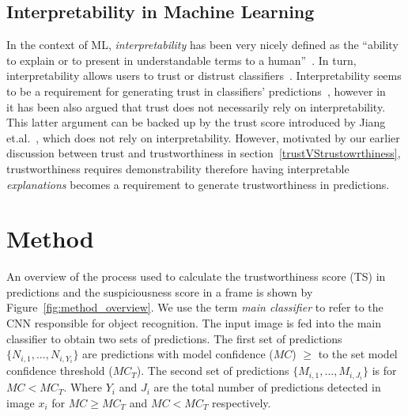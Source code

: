 \subsection{Interpretability in Machine Learning}
In the context of ML, \textit{interpretability} has been very nicely defined as the ``ability to explain or to present in understandable terms to a human''~\cite{Doshi-Velez2017}. 
%
In turn, interpretability allows users to trust or distrust classifiers~\cite{Rudin2022}. 
%
Interpretability seems to be a requirement for generating trust in classifiers' predictions~\cite{Ribeiro2016, Lipton2018}, however in ~\cite{Lipton2018} it has been also argued that trust does not necessarily rely on interpretability. This latter argument can be backed up by the trust score introduced by Jiang et.al.~\cite{Jiang2018}, which does not rely on interpretability. 
%
However, motivated by our earlier discussion between trust and trustworthiness in section~\ref{trustVStrustowrthiness}, trustworthiness requires demonstrability therefore having interpretable \textit{explanations} becomes a requirement to generate trustworthiness in predictions.
%
%



\section{Method} \label{sec:method}
An overview of the process used to calculate the trustworthiness score (TS) in predictions and the suspiciousness score in a frame is shown by 
Figure~\ref{fig:method_overview}. 
%
We use the term \textit{main classifier} to refer to the CNN responsible for object recognition. 
%
The input image is fed into the main classifier to obtain two sets of predictions. The first set of predictions $\{N_{i,1},..., N_{i,Y_i}\}$ are predictions with model confidence ($MC$) $\geq$ to the set model confidence threshold ($MC_T$). The second set of predictions $\{M_{i,1},..., M_{i,J_i}\}$ is for $MC < MC_T$. Where $Y_i$ and $J_i$ are the total number of predictions detected in image $x_i$ for $MC \geq MC_T$ and $MC<MC_T$ respectively.

